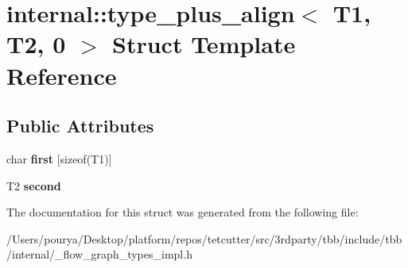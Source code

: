 \hypertarget{structinternal_1_1type__plus__align_3_01T1_00_01T2_00_010_01_4}{}\section{internal\+:\+:type\+\_\+plus\+\_\+align$<$ T1, T2, 0 $>$ Struct Template Reference}
\label{structinternal_1_1type__plus__align_3_01T1_00_01T2_00_010_01_4}
\subsection*{Public Attributes}
\begin{DoxyCompactItemize}
\item 
\hypertarget{structinternal_1_1type__plus__align_3_01T1_00_01T2_00_010_01_4_a5e4249032b9963ad2da952a13da14cbe}{}char {\bfseries first} \mbox{[}sizeof(T1)\mbox{]}\label{structinternal_1_1type__plus__align_3_01T1_00_01T2_00_010_01_4_a5e4249032b9963ad2da952a13da14cbe}

\item 
\hypertarget{structinternal_1_1type__plus__align_3_01T1_00_01T2_00_010_01_4_a0fcb2aa67b6bbddbecfa1ef811164f2a}{}T2 {\bfseries second}\label{structinternal_1_1type__plus__align_3_01T1_00_01T2_00_010_01_4_a0fcb2aa67b6bbddbecfa1ef811164f2a}

\end{DoxyCompactItemize}


The documentation for this struct was generated from the following file\+:\begin{DoxyCompactItemize}
\item 
/\+Users/pourya/\+Desktop/platform/repos/tetcutter/src/3rdparty/tbb/include/tbb/internal/\+\_\+flow\+\_\+graph\+\_\+types\+\_\+impl.\+h\end{DoxyCompactItemize}
